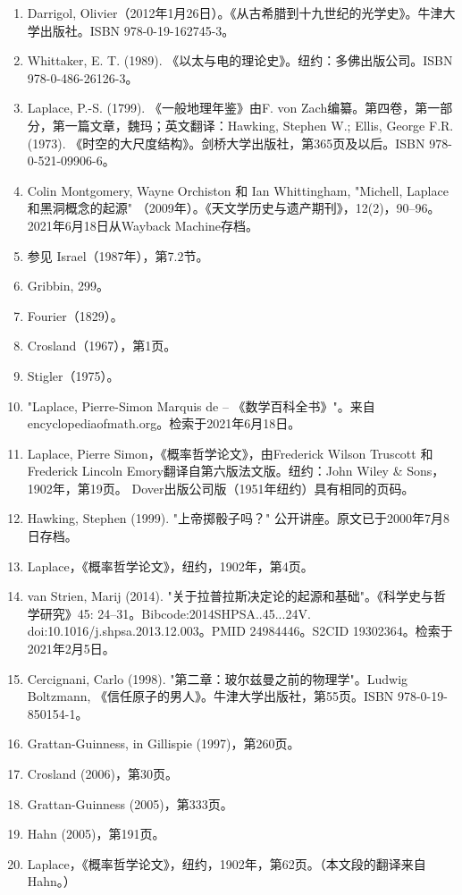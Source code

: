 \begin{enumerate}
\item Darrigol, Olivier（2012年1月26日）。《从古希腊到十九世纪的光学史》。牛津大学出版社。ISBN 978-0-19-162745-3。
\item Whittaker, E. T. (1989). 《以太与电的理论史》。纽约：多佛出版公司。ISBN 978-0-486-26126-3。  
\item Laplace, P.-S. (1799). 《一般地理年鉴》由F. von Zach编纂。第四卷，第一部分，第一篇文章，魏玛；英文翻译：Hawking, Stephen W.; Ellis, George F.R. (1973). 《时空的大尺度结构》。剑桥大学出版社，第365页及以后。ISBN 978-0-521-09906-6。  
\item Colin Montgomery, Wayne Orchiston 和 Ian Whittingham, "Michell, Laplace 和黑洞概念的起源" （2009年）。《天文学历史与遗产期刊》，12(2)，90–96。2021年6月18日从Wayback Machine存档。  
\item 参见 Israel（1987年），第7.2节。  
\item Gribbin, 299。  
\item Fourier（1829）。  
\item Crosland（1967），第1页。  
\item Stigler（1975）。  
\item "Laplace, Pierre-Simon Marquis de – 《数学百科全书》"。来自 encyclopediaofmath.org。检索于2021年6月18日。
\item Laplace, Pierre Simon，《概率哲学论文》，由Frederick Wilson Truscott 和 Frederick Lincoln Emory翻译自第六版法文版。纽约：John Wiley & Sons，1902年，第19页。 Dover出版公司版（1951年纽约）具有相同的页码。  
\item Hawking, Stephen (1999). "上帝掷骰子吗？" 公开讲座。原文已于2000年7月8日存档。  
\item Laplace，《概率哲学论文》，纽约，1902年，第4页。  
\item van Strien, Marij (2014). "关于拉普拉斯决定论的起源和基础"。《科学史与哲学研究》45: 24–31。Bibcode:2014SHPSA..45...24V. doi:10.1016/j.shpsa.2013.12.003。PMID 24984446。S2CID 19302364。检索于2021年2月5日。  
\item Cercignani, Carlo (1998). "第二章：玻尔兹曼之前的物理学"。Ludwig Boltzmann, 《信任原子的男人》。牛津大学出版社，第55页。ISBN 978-0-19-850154-1。  
\item Grattan-Guinness, in Gillispie (1997)，第260页。  
\item Crosland (2006)，第30页。  
\item Grattan-Guinness (2005)，第333页。  
\item Hahn (2005)，第191页。  
\item Laplace，《概率哲学论文》，纽约，1902年，第62页。（本文段的翻译来自Hahn。）  

\end{enumerate}
